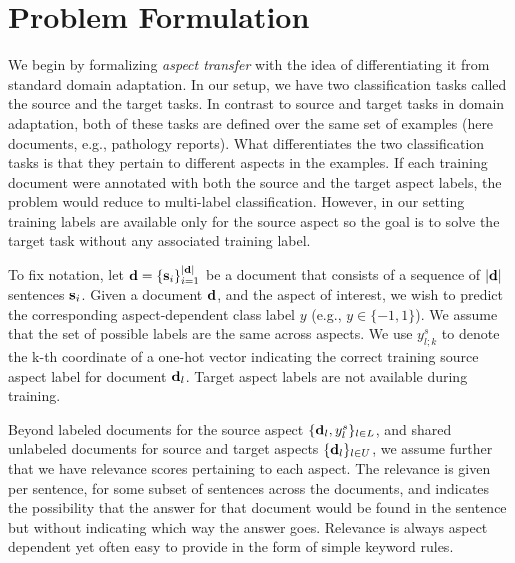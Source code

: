 
\section{Problem Formulation}

We begin by formalizing \emph{aspect transfer} with the idea of differentiating it from standard domain adaptation. In our setup, we have two classification tasks called the source and the target tasks. In contrast to source and target tasks in domain adaptation, both of these tasks are defined over the same set of examples (here documents, e.g., pathology reports). What differentiates the two classification tasks is that they pertain to different aspects in the examples. If each training document were annotated with both the source and the target aspect labels, the problem would reduce to multi-label classification. However, in our setting training labels are available only for the source aspect so the goal is to solve the target task without any associated training label. 

To fix notation, let $\mathbf{d}=\{\mathbf{s}_i\}_{i=1}^{|\mathbf{d}|}$ be a document that consists of a sequence of $|\mathbf{d}|$ sentences $\mathbf{s}_i$. Given a document $\mathbf{d}$, and the aspect of interest, we wish to predict the corresponding aspect-dependent class label $y$ (e.g., $y\in\{-1,1\}$). We assume that the set of possible labels are the same across aspects. We use $y^s_{l;k}$ to denote the k-th coordinate of a one-hot vector indicating the correct training source aspect label for document $\mathbf{d}_l$. Target aspect labels are not available during training. 


Beyond labeled documents for the source aspect $\{\mathbf{d}_l,y^s_l\}_{l\in L}$, and shared unlabeled documents for source and target aspects $\{\mathbf{d}_l\}_{l\in U}$, we assume further that we have relevance scores pertaining to each aspect. The relevance is given per sentence, for some subset of sentences across the documents, and indicates the possibility that the answer for that document would be found in the sentence but without indicating which way the answer goes. Relevance is always aspect dependent yet often easy to provide in the form of simple keyword rules. 

